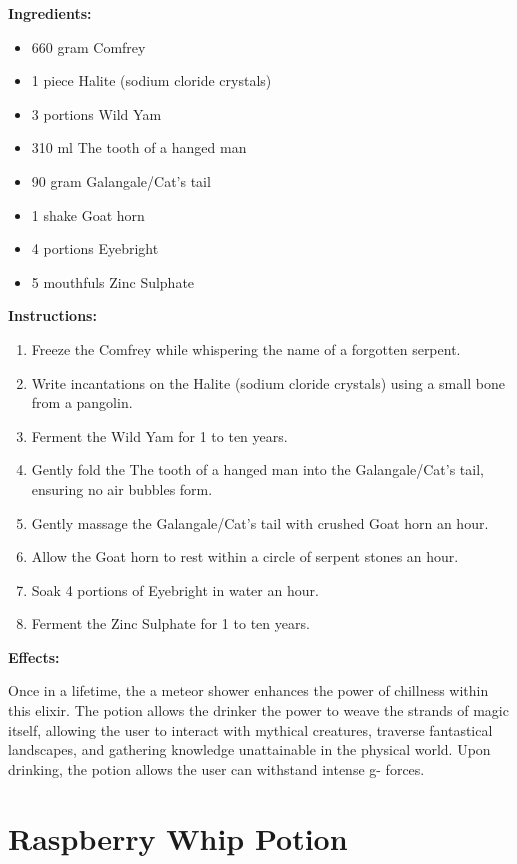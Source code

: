 \documentclass{article}
\begin{document}
\textbf{Ingredients:}

\begin{itemize}
  \item 660 gram Comfrey
  \item 1 piece Halite (sodium cloride crystals)
  \item 3 portions Wild Yam
  \item 310 ml The tooth of a hanged man
  \item 90 gram Galangale/Cat's tail
  \item 1 shake Goat horn
  \item 4 portions Eyebright
  \item 5 mouthfuls Zinc Sulphate
\end{itemize}

\textbf{Instructions:}

\begin{enumerate}
  \item Freeze the Comfrey while whispering the name of a forgotten serpent.
  \item Write incantations on the Halite (sodium cloride crystals) using a small bone from a pangolin.
  \item Ferment the Wild Yam for 1 to ten years.
  \item Gently fold the The tooth of a hanged man into the Galangale/Cat's tail, ensuring no air bubbles form.
  \item Gently massage the Galangale/Cat's tail with crushed Goat horn an hour.
  \item Allow the Goat horn to rest within a circle of serpent stones an hour.
  \item Soak 4 portions of Eyebright in water an hour.
  \item Ferment the Zinc Sulphate for 1 to ten years.
\end{enumerate}

\textbf{Effects:}

Once in a lifetime, the a meteor shower enhances the power of chillness within this elixir. The potion allows the drinker the power to weave the strands of magic itself, allowing the user to interact with mythical creatures, traverse fantastical landscapes, and gathering knowledge unattainable in the physical world. Upon drinking, the potion allows the user can withstand intense g- forces.

\newpage
\section*{Raspberry Whip Potion}
\end{document}
